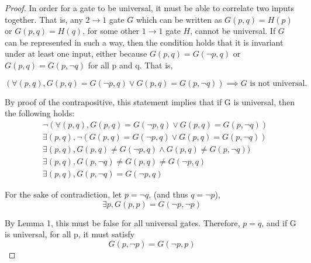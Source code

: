 \documentclass[12pt]{article}
\begin{document}
\begin{proof}
	In order for a gate to be universal, it must be able to correlate two inputs together. That is, any $ 2 \to 1$ gate $G$ which can be written as $G(p, q) = H(p)$ or $G(p, q) = H(q)$, for some other $1 \to 1$ gate $H$, cannot be universal. If $G$ can be represented in such a way, then the condition holds that it is invariant under at least one input, either because $G(p, q) = G(\neg p, q)$ or $G(p, q) = G(p, \neg q)$ for all p and q. That is,

    $$(\forall (p, q), G(p, q) = G(\neg p, q) \lor G(p, q) = G(p, \neg q)) \implies G \text{ is not universal.}$$

    By proof of the contrapositive, this statement implies that if G is universal, then the following holds:
    \begin{align}
        &\neg (\forall (p, q), G(p, q) = G(\neg p, q) \lor G(p, q) = G(p, \neg q)) \\
        &\exists (p, q), \neg (G(p, q) = G(\neg p, q) \lor G(p, q) = G(p, \neg q)) \\
        &\exists (p, q), G(p, q) \ne G(\neg p, q) \land G(p, q) \ne G(p, \neg q)) \\
        &\exists (p, q), G(p, \neg q) \ne G(p, q) \ne G(\neg p, q) \\
        &\exists (p, q), G(p, \neg q) = G(\neg p, q)
    \end{align}

    For the sake of contradiction, let $p = \neg q$, (and thus $q = \neg p$),
    $$\exists p, G(p, p) = G(\neg p, \neg p)$$

    By Lemma 1, this must be false for all universal gates. Therefore, $p = q$, and if G is universal, for all p, it must satisfy
    $$G(p, \neg p) = G(\neg p, p)$$
\end{proof}
\end{document}
